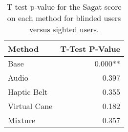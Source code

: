 
\begin{table}[!htb]
\centering
\caption{T test p-value for the Sagat score on each method for blinded users versus sighted users.}
\label{tab:ttest_sagat_score}
\begin{tabular}{lr}
\toprule
      Method & T-Test P-Value \\
\midrule
        Base &        0.000** \\
       Audio &          0.397 \\
 Haptic Belt &          0.355 \\
Virtual Cane &          0.182 \\
     Mixture &          0.357 \\
\bottomrule
\end{tabular}
\end{table}

